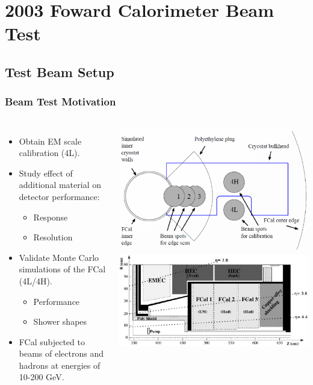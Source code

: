 \documentclass[10pt]{beamer}
\begin{document}
\section{2003 Foward Calorimeter Beam Test}
\subsection{Test Beam Setup}
\begin{frame}\frametitle{Beam Test Motivation}
\begin{columns}
\begin{itemize}
\item Obtain EM scale calibration (4L).
\item Study effect of additional material on detector performance:
\begin{itemize}
\item Response
\item Resolution
\end{itemize}
\item Validate Monte Carlo simulations of the FCal (4L/4H). 
\begin{itemize}
\item Performance
\item Shower shapes
\end{itemize}
\item FCal subjected to beams of electrons and hadrons at energies of 10-200 GeV.
\end{itemize}
\includegraphics[width=1.0\linewidth,angle=0]{TB_beamspots.eps}\\
\includegraphics[width=1.0\linewidth,angle=0]{atlas_EC_xsec2.eps}\\

\end{columns}
\end{frame}
\end{document}

